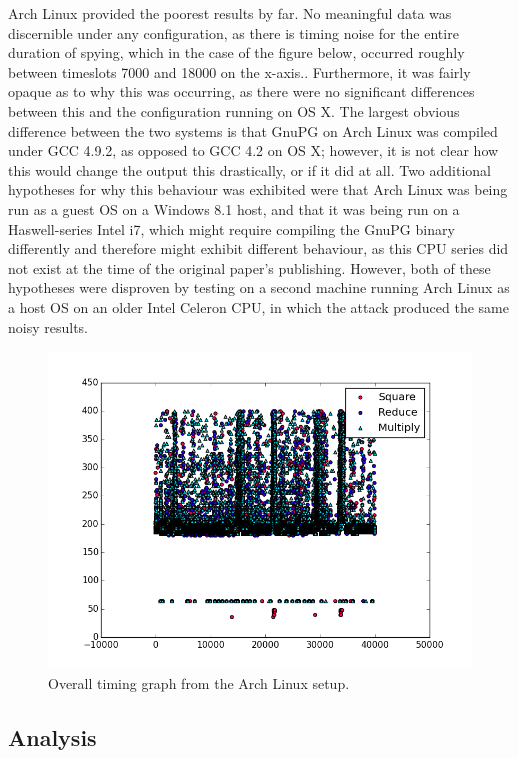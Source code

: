 \documentclass[11pt]{llncs}
\begin{document}
Arch Linux provided the poorest results by far. No meaningful data was
discernible under any configuration, as there is timing noise for the entire
duration of spying, which in the case of the figure below, occurred roughly
between timeslots 7000 and 18000 on the x-axis.. Furthermore, it was fairly
opaque as to why this was occurring, as there were no significant differences
between this and the configuration running on OS X. The largest obvious
difference between the two systems is that GnuPG on Arch Linux was compiled
under GCC 4.9.2, as opposed to GCC 4.2 on OS X; however, it is not clear how
this would change the output this drastically, or if it did at all. Two
additional hypotheses for why this behaviour was exhibited were that Arch Linux
was being run as a guest OS on a Windows 8.1 host, and that it was being run on
a Haswell-series Intel i7, which might require compiling the GnuPG binary
differently and therefore might exhibit different behaviour, as this CPU series
did not exist at the time of the original paper's publishing.  However, both of
these hypotheses were disproven by testing on a second machine running Arch
Linux as a host OS on an older Intel Celeron CPU, in which the attack produced
the same noisy results.

\begin{figure}[h]
  \centering
    \includegraphics[width=\linewidth]{img/data/arch-graph-1}
  \caption{Overall timing graph from the Arch Linux setup.}
  \label{fig:data-arch}
\end{figure}

\subsection{Analysis}
\end{document}
